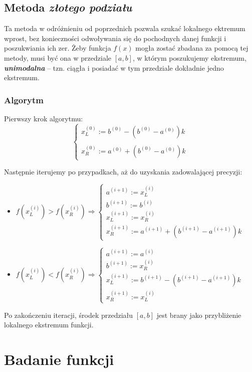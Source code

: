 \documentclass[a4paper,11pt]{article}
\begin{document}
  \subsection{Metoda \emph{złotego podziału}}
    Ta metoda w odróżnieniu od poprzednich pozwala szukać lokalnego ektremum wprost, bez konieczności odwoływania się do pochodnych danej funkcji i poszukwiania ich zer. Żeby funkcja \( f(x) \) mogła zostać zbadana za pomocą tej metody, musi być ona w przedziale \( [a,b] \), w którym poszukujemy ekstremum, \textbf{\emph{unimodalna}} -- tzn. ciągła i posiadać w tym przedziale dokładnie jedno ekstremum.
    \subsubsection{Algorytm}
    Pierwszy krok algorytmu:
    $$ \left\{\begin{array}{l}
    x_L^{(0)} := b^{(0)} - (b^{(0)}-a^{(0)})k \\ \\
    x_R^{(0)} := a^{(0)} + (b^{(0)}-a^{(0)})k
    \end{array}\right. $$
    
    Następnie iterujemy po przypadkach, aż do uzyskania zadowalającej precyzji:
    \begin{itemize}
      \item \( f(x_L^{(i)}) > f(x_R^{(i)}) \Rightarrow \left\{\begin{array}{l}
        a^{(i+1)} := x_L^{(i)} \\
        b^{(i+1)} := b^{(i)} \\
        x_L^{(i+1)} := x_R^{(i)} \\
        x_R^{(i+1)} := a^{(i+1)} + (b^{(i+1)}-a^{(i+1)})k
        \end{array}\right. \)
      \item \( f(x_L^{(i)}) < f(x_R^{(i)}) \Rightarrow \left\{\begin{array}{l}
        a^{(i+1)} := a^{(i)} \\
        b^{(i+1)} := x_R^{(i)} \\
        x_L^{(i+1)} := b^{(i+1)} - (b^{(i+1)}-a^{(i+1)})k \\
        x_R^{(i+1)} := x_L^{(i)}
        \end{array}\right. \)
    \end{itemize}
    Po zakończeniu iteracji, środek przedziału $[a,b]$ jest brany jako przybliżenie lokalnego ekstremum funkcji.
  \section{Badanie funkcji}
  
\end{document}
